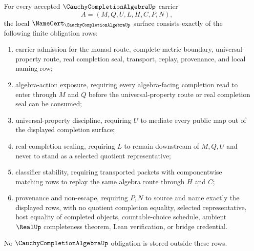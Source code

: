 \begin{theorem}
\label{thm:cauchy-completion-algebra-obligations}
For every accepted $\CauchyCompletionAlgebraUp$ carrier
$$
A=(M,Q,U,L,H,C,P,N),
$$
the local $\NameCert_{\CauchyCompletionAlgebraUp}$ surface consists exactly of the following finite obligation rows:
\begin{enumerate}
\item carrier admission for the monad route, complete-metric boundary, universal-property route, real completion seal, transport, replay, provenance, and local naming row;
\item algebra-action exposure, requiring every algebra-facing completion read to enter through $M$ and $Q$ before the universal-property route or real completion seal can be consumed;
\item universal-property discipline, requiring $U$ to mediate every public map out of the displayed completion surface;
\item real-completion sealing, requiring $L$ to remain downstream of $M,Q,U$ and never to stand as a selected quotient representative;
\item classifier stability, requiring transported packets with componentwise matching rows to replay the same algebra route through $H$ and $C$;
\item provenance and non-escape, requiring $P,N$ to source and name exactly the displayed rows, with no quotient completion equality, selected representative, host equality of completed objects, countable-choice schedule, ambient $\RealUp$ completeness theorem, Lean verification, or bridge credential.
\end{enumerate}
No $\CauchyCompletionAlgebraUp$ obligation is stored outside these rows.
\end{theorem}
